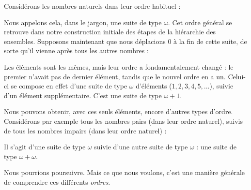\documentclass[../../../include/open-logic-section]{subfiles}
\begin{document}


Considérons les nombres naturels dans leur ordre habituel :
\begin{center}
\end{center}
Nous appelons cela, dans le jargon, une suite de type $\omega$.
Cet ordre général se retrouve dans notre construction initiale des
étapes de la hiérarchie des ensembles. Supposons maintenant que nous
déplacions $0$ à la fin de cette suite, de sorte qu'il vienne après
tous les autres nombres :
\begin{center}
\end{center}
Les éléments sont les mêmes, mais leur ordre a fondamentalement changé :
le premier n'avait pas de dernier élément, tandis que le nouvel ordre
en a un. Celui-ci se compose en effet d'une suite de type $\omega$
d'éléments ($1, 2, 3, 4, 5, \ldots$), suivie d'un élément
supplémentaire. C'est une suite de type $\omega+1$.

Nous pouvons obtenir, avec ces seuls éléments, encore d'autres types
d'ordre. Considérons par exemple tous les nombres pairs (dans leur
ordre naturel), suivis de tous les nombres impairs (dans leur ordre
naturel) :
\begin{center}
\end{center}
Il s'agit d'une suite de type $\omega$ suivie d'une autre suite de
type $\omega$ : une suite de type $\omega+\omega$.

Nous pourrions poursuivre. Mais ce que nous voulons, c'est une manière
générale de comprendre ces différents \emph{ordres}.
\end{document}
